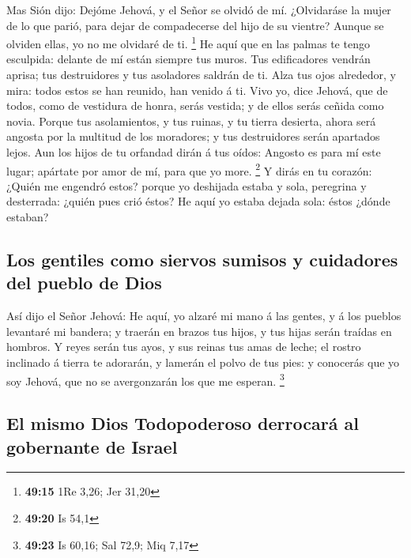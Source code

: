  Mas Sión dijo: Dejóme Jehová, y el Señor se olvidó de mí.
 ¿Olvidaráse la mujer de lo que parió, para dejar de
compadecerse del hijo de su vientre? Aunque se olviden ellas, yo no me
olvidaré de ti. \footnote{\textbf{49:15} 1Re 3,26; Jer 31,20}
 He aquí que en las palmas te tengo esculpida: delante de
mí están siempre tus muros.  Tus edificadores vendrán
aprisa; tus destruidores y tus asoladores saldrán de ti. 
Alza tus ojos alrededor, y mira: todos estos se han reunido, han venido
á ti. Vivo yo, dice Jehová, que de todos, como de vestidura de honra,
serás vestida; y de ellos serás ceñida como novia.  Porque
tus asolamientos, y tus ruinas, y tu tierra desierta, ahora será angosta
por la multitud de los moradores; y tus destruidores serán apartados
lejos.  Aun los hijos de tu orfandad dirán á tus oídos:
Angosto es para mí este lugar; apártate por amor de mí, para que yo
more. \footnote{\textbf{49:20} Is 54,1}  Y dirás en tu
corazón: ¿Quién me engendró estos? porque yo deshijada estaba y sola,
peregrina y desterrada: ¿quién pues crió éstos? He aquí yo estaba dejada
sola: éstos ¿dónde estaban?

\hypertarget{los-gentiles-como-siervos-sumisos-y-cuidadores-del-pueblo-de-dios}{%
\subsection{Los gentiles como siervos sumisos y cuidadores del pueblo de
Dios}\label{los-gentiles-como-siervos-sumisos-y-cuidadores-del-pueblo-de-dios}}

 Así dijo el Señor Jehová: He aquí, yo alzaré mi mano á las
gentes, y á los pueblos levantaré mi bandera; y traerán en brazos tus
hijos, y tus hijas serán traídas en hombros.  Y reyes serán
tus ayos, y sus reinas tus amas de leche; el rostro inclinado á tierra
te adorarán, y lamerán el polvo de tus pies: y conocerás que yo soy
Jehová, que no se avergonzarán los que me esperan. \footnote{\textbf{49:23}
  Is 60,16; Sal 72,9; Miq 7,17}

\hypertarget{el-mismo-dios-todopoderoso-derrocaruxe1-al-gobernante-de-israel}{%
\subsection{El mismo Dios Todopoderoso derrocará al gobernante de
Israel}\label{el-mismo-dios-todopoderoso-derrocaruxe1-al-gobernante-de-israel}}

